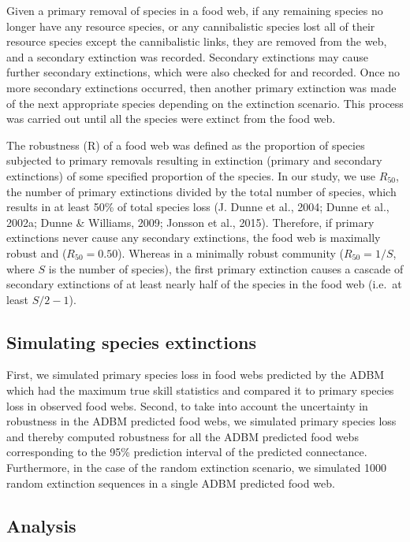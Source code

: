 \documentclass{article}
\begin{document}
Given a primary removal of species in a food web, if any remaining
species no longer have any resource species, or any cannibalistic
species lost all of their resource species except the cannibalistic
links, they are removed from the web, and a secondary extinction was
recorded. Secondary extinctions may cause further secondary extinctions,
which were also checked for and recorded. Once no more secondary
extinctions occurred, then another primary extinction was made of the
next appropriate species depending on the extinction scenario. This
process was carried out until all the species were extinct from the food
web.

The robustness (R) of a food web was defined as the proportion of
species subjected to primary removals resulting in extinction (primary
and secondary extinctions) of some specified proportion of the species.
In our study, we use \(R_{50}\), the number of primary extinctions
divided by the total number of species, which results in at least 50\%
of total species loss (J. Dunne et al., 2004; Dunne et al., 2002a; Dunne
\& Williams, 2009; Jonsson et al., 2015). Therefore, if primary
extinctions never cause any secondary extinctions, the food web is
maximally robust and (\(R_{50} = 0.50\)). Whereas in a minimally robust
community (\(R_{50} = 1/S\), where \(S\) is the number of species), the
first primary extinction causes a cascade of secondary extinctions of at
least nearly half of the species in the food web (i.e.~at least
\(S/2 - 1\)).

\hypertarget{simulating-species-extinctions}{%
\subsection{Simulating species
extinctions}\label{simulating-species-extinctions}}

First, we simulated primary species loss in food webs predicted by the
ADBM which had the maximum true skill statistics and compared it to
primary species loss in observed food webs. Second, to take into account
the uncertainty in robustness in the ADBM predicted food webs, we
simulated primary species loss and thereby computed robustness for all
the ADBM predicted food webs corresponding to the 95\% prediction
interval of the predicted connectance. Furthermore, in the case of the
random extinction scenario, we simulated 1000 random extinction
sequences in a single ADBM predicted food web.

\hypertarget{analysis}{%
\subsection{Analysis}\label{analysis}}
\end{document}
